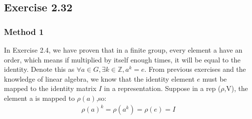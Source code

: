 \documentclass[]{ctexart}
\begin{document}
	\subsection{Exercise 2.32}
%			
%			
%			
%			
		\subsubsection{Method 1}
			In Exercise 2.4, we have proven that in a finite group, every element a have an order, which means if multiplied by itself enough times, it will be equal to the identity. Denote this as $\forall a\in G, \exists k\in \mathbb{Z}, a^k=e$. From previous exercises and the knowledge of linear algebra, we know that the identity element $ e $ must be mapped to the identity matrix $ I $ in a representation. Suppose in a rep ($\rho$,V), the element a is mapped to $\rho(a)$,so:
				\begin{equation*}
				\begin{aligned}
					\rho (a)^k=\rho(a^k)=\rho(e)=I
				\end{aligned}
				\end{equation*}
				
\end{document}
